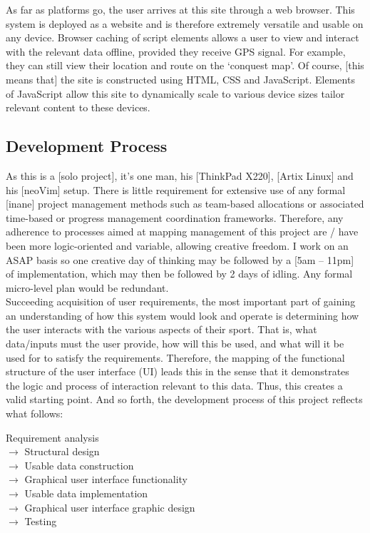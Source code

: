 \documentclass[11pt, english]{article}
\begin{document}
	As far as platforms go, the user arrives at this site through a web browser. This system is deployed as a website and is therefore extremely versatile and usable on any device. Browser caching of script elements allows a user to view and interact with the relevant data offline, provided they receive GPS signal. For example, they can still view their location and route on the `conquest map'. Of course, [this means that] the site is constructed using HTML, CSS and JavaScript. Elements of JavaScript allow this site to dynamically scale to various device sizes tailor relevant content to these devices.

	\subsection{Development Process}

	As this is a [solo project], it's one man, his [ThinkPad X220], [Artix Linux] and his [neoVim] setup. There is little requirement for extensive use of any formal [inane] project management methods such as team-based allocations or associated time-based or progress management coordination frameworks. Therefore, any adherence to processes aimed at mapping management of this project are / have been more logic-oriented and variable, allowing creative freedom. I work on an ASAP basis so one creative day of thinking may be followed by a [5am -- 11pm] of implementation, which may then be followed by 2 days of idling. Any formal micro-level plan would be redundant.\\

	Succeeding acquisition of user requirements, the most important part of gaining an understanding of how this system would look and operate is determining how the user interacts with the various aspects of their sport. That is, what data/inputs must the user provide, how will this be used, and what will it be used for to satisfy the requirements. Therefore, the mapping of the functional structure of the user interface (UI) leads this in the sense that it demonstrates the logic and process of interaction relevant to this data. Thus, this creates a valid starting point. And so forth, the development process of this project reflects what follows:

	\begin{center}
		Requirement analysis\\
		$\rightarrow$ Structural design\\
		$\rightarrow$ Usable data construction\\
		$\rightarrow$ Graphical user interface functionality\\
		$\rightarrow$ Usable data implementation\\
		$\rightarrow$ Graphical user interface graphic design\\
		$\rightarrow$ Testing
	\end{center}
\end{document}
